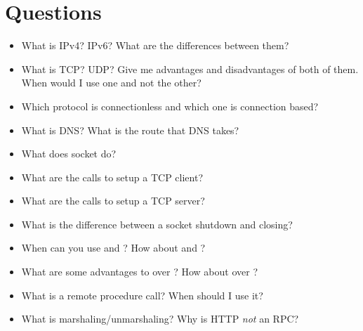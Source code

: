 \section{Questions}

\begin{itemize}
\item
  What is IPv4? IPv6? What are the differences between them?
\item
  What is TCP? UDP? Give me advantages and disadvantages of both of them.
  When would I use one and not the other?
\item
  Which protocol is connectionless and which one is connection based?
\item
  What is DNS? What is the route that DNS takes?
\item
  What does socket do?
\item
  What are the calls to setup a TCP client?
\item
  What are the calls to setup a TCP server?
\item
  What is the difference between a socket shutdown and closing?
\item
  When can you use  and ? How about  and ?
\item
  What are some advantages to  over ? How about  over ?
\item
  What is a remote procedure call? When should I use it?
\item
  What is marshaling/unmarshaling? Why is HTTP \emph{not} an RPC?
\end{itemize}



